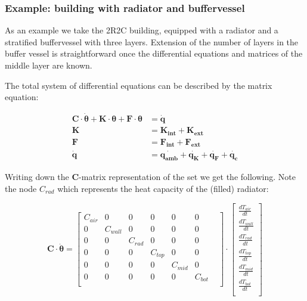 \subsubsection{Example: building with radiator and buffervessel}

As an example we take the 2R2C building, equipped with a radiator and a stratified buffervessel with three layers. Extension of the number of layers in the buffer vessel is straightforward once the differential equations and matrices of the middle layer are known.

The total system of differential equations can be described by the matrix equation:

\begin{subequations}
	\label{app:eq:matexample}
	\begin{align}
		\mathbf{C} \cdot \boldsymbol{\dot{\theta}} + \mathbf{K} \cdot \boldsymbol{\theta} + \mathbf{F} \cdot \boldsymbol{\theta} &= \mathbf{\dot{q}} \\
		\mathbf{K} &= \mathbf{K_{int}} + \mathbf{K_{ext}} \\
		\mathbf{F} &= \mathbf{F_{int}} + \mathbf{F_{ext}} \\
		\mathbf{\dot{q}} &= \mathbf{\dot{q_{amb}}} + \mathbf{\dot{q_{K}}} + \mathbf{\dot{q_{F}}} + \mathbf{\dot{q_{c}}}
	\end{align}
\end{subequations}

Writing down the $\mathbf{C}$-matrix representation of the set we get the following. Note the node $C_{rad}$ which represents the heat capacity of the (filled) radiator:

\begin{equation}
	\mathbf{C} \cdot \boldsymbol{\dot{\theta}} =
	\begin{bmatrix}
		C_{air} & 0 & 0 & 0 & 0 & 0 &  \\
		0 &  C_{wall} & 0 & 0 & 0 & 0  \\
		0 &  0 & C_{rad} & 0 & 0 & 0  \\
		0 &  0 & 0 & C_{top} & 0 & 0  \\
		0 &  0 & 0 & 0 & C_{mid} & 0  \\
		0 &  0 & 0 & 0 & 0 & C_{bot}  \\
	\end{bmatrix}
	\cdot
	\begin{bmatrix}
		\frac{dT_{air}}{dt} \\
		\frac{dT_{wall}}{dt} \\
		\frac{dT_{rad}}{dt} \\
		\frac{dT_{top}}{dt} \\
		\frac{dT_{mid}}{dt}  \\
		\frac{dT_{bot}}{dt} \\
	\end{bmatrix}
\end{equation}

